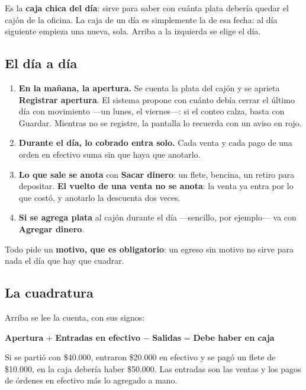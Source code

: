 \documentclass[11pt,a4paper]{article}
\begin{document}

Es la \textbf{caja chica del día}: sirve para saber con cuánta plata debería
quedar el cajón de la oficina. La caja de un día es simplemente la de esa fecha:
al día siguiente empieza una nueva, sola. Arriba a la izquierda se elige el día.

\subsection{El día a día}

\begin{enumerate}
  \item \textbf{En la mañana, la apertura.} Se cuenta la plata del cajón y se
        aprieta \textbf{Registrar apertura}. El sistema propone con cuánto
        debía cerrar el último día con movimiento ---un lunes, el viernes---: si
        el conteo calza, basta con Guardar. Mientras no se registre, la pantalla
        lo recuerda con un aviso en rojo.
  \item \textbf{Durante el día, lo cobrado entra solo.} Cada venta y cada pago
        de una orden en efectivo suma sin que haya que anotarlo.
  \item \textbf{Lo que sale se anota} con \textbf{Sacar dinero}: un flete,
        bencina, un retiro para depositar. \textbf{El vuelto de una venta no se
        anota}: la venta ya entra por lo que costó, y anotarlo la descuenta dos
        veces.
  \item \textbf{Si se agrega plata} al cajón durante el día ---sencillo, por
        ejemplo--- va con \textbf{Agregar dinero}.
\end{enumerate}

Todo pide un \textbf{motivo, que es obligatorio}: un egreso sin motivo no sirve
para nada el día que hay que cuadrar.

\subsection{La cuadratura}

Arriba se lee la cuenta, con sus signos:

\begin{center}
\textbf{Apertura} + \textbf{Entradas en efectivo} $-$ \textbf{Salidas} =
\textbf{Debe haber en caja}
\end{center}

Si se partió con \$40.000, entraron \$20.000 en efectivo y se pagó un flete de
\$10.000, en la caja debería haber \$50.000. Las entradas son las ventas y los
pagos de órdenes en efectivo más lo agregado a mano.
\end{document}
